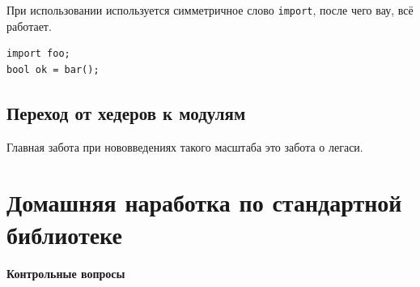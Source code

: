 \documentclass[a4paper,12pt,oneside]{book}
\begin{document}
При использовании используется симметричное слово \lstinline!import!, после чего вау, всё работает.

\begin{lstlisting}
import foo;
bool ok = bar(); 
\end{lstlisting}

\subsection{Переход от хедеров к модулям}

Главная забота при нововведениях такого масштаба это забота о легаси.
\fi

\pagebreak
\section{Домашняя наработка по стандартной библиотеке}

\textbf{Контрольные вопросы}
\end{document}
